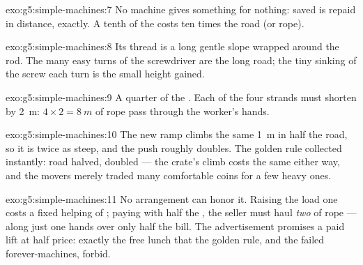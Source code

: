 \begin{solution}{exo:g5:simple-machines:7}
No machine gives something for nothing:  saved is repaid in
distance, exactly. A tenth of the  costs ten times the road
(or rope).
\end{solution}

\begin{solution}{exo:g5:simple-machines:8}
Its thread is a long gentle slope wrapped around the rod. The many
easy turns of the screwdriver are the long road; the tiny sinking
of the screw each turn is the small height gained.
\end{solution}

\begin{solution}{exo:g5:simple-machines:9}
A quarter of the . Each of the four strands must shorten by
\qty{2}{m}: $4 \times 2 = \qty{8}{m}$ of rope pass through the
worker's hands.
\end{solution}

\begin{solution}{exo:g5:simple-machines:10}
The new ramp climbs the same \qty{1}{m} in half the road, so it is
twice as steep, and the push roughly doubles. The golden rule
collected instantly: road halved,  doubled --- the crate's
climb costs the same either way, and the movers merely traded many
comfortable coins for a few heavy ones.
\end{solution}

\begin{solution}{exo:g5:simple-machines:11}
No arrangement can honor it. Raising the load one  costs a
fixed helping of ; paying with half the , the seller
must haul \emph{two}  of rope ---  along just one
 hands over only half the bill. The advertisement promises a
paid lift at half price: exactly the free lunch that the golden
rule, and the failed forever-machines, forbid.
\end{solution}
